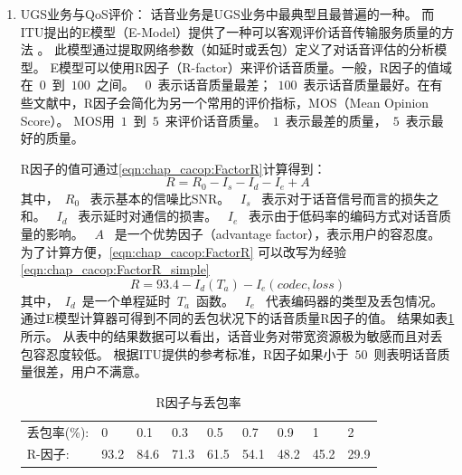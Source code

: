 \begin{enumerate}[(1)]
     \item UGS业务与QoS评价：
        话音业务是UGS业务中最典型且最普遍的一种。
        而ITU提出的E模型（E-Model）提供了一种可以客观评价话音传输服务质量的方法 \cite{ITU:G107}。
        此模型通过提取网络参数（如延时或丢包）定义了对话音评估的分析模型。
        E模型可以使用R因子（R-factor）来评价话音质量。一般，R因子的值域在~$0$~到~$100$~之间。
        ~$0$~表示话音质量最差；~$100$~表示话音质量最好。在有些文献中，R因子会简化为另一个常用的评价指标，MOS（Mean Opinion Score）。
        MOS用~$1$~到~$5$~来评价话音质量。~$1$~表示最差的质量，~$5$~表示最好的质量\cite{NK:IEICE:2005}。

        R因子的值可通过\eqref{eqn:chap_cacop:FactorR}计算得到：
\begin{equation}
\label{eqn:chap_cacop:FactorR}
R = R_0 − I_s − I_d − I_e + A 
\end{equation}
其中，~$R_0$~ 表示基本的信噪比SNR。
~$I_s$~ 表示对于话音信号而言的损失之和。
~$I_d$~ 表示延时对通信的损害。
~$I_e$~ 表示由于低码率的编码方式对话音质量的影响。
~$A$~ 是一个优势因子（advantage factor），表示用户的容忍度。
为了计算方便，\eqref{eqn:chap_cacop:FactorR} 可以改写为经验\eqref{eqn:chap_cacop:FactorR_simple}
\begin{equation}
R = 93. 4 - I_d ( T_a ) -I_e ( codec, loss )
\label{eqn:chap_cacop:FactorR_simple}
\end{equation}
其中，~$I_d$~是一个单程延时~$T_a$~函数。
~$I_e$~ 代表编码器的类型及丢包情况。
通过E模型计算器可得到不同的丢包状况下的话音质量R因子的值\cite{ITU:EModel:Caculator}。 
结果如表\ref{tb:R_factor}所示。
从表中的结果数据可以看出，话音业务对带宽资源极为敏感而且对丢包容忍度较低。
根据ITU提供的参考标准，R因子如果小于~$50$~则表明话音质量很差，用户不满意。

\begin{table}[tb]
\setlength{\abovecaptionskip}{2pt}
\setlength{\belowcaptionskip}{8pt}
\caption{R因子与丢包率} \label{tb:R_factor}
\begin{center}
\wuhao
\begin{tabularx}{0.99\textwidth}{lXXXXXXXX}
\toprule 
丢包率(\%): & 0& 0.1& 0.3& 0.5& 0.7& 0.9& 1& 2\\
R-因子: &93.2& 84.6& 71.3& 61.5& 54.1& 48.2& 45.2& 29.9\\ 
\bottomrule
\end{tabularx}
\end{center}
\end{table}


\end{enumerate}
